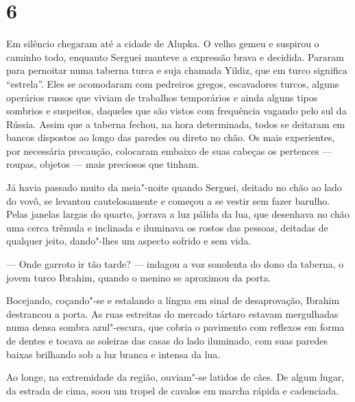 \section{6}

Em silêncio chegaram até a cidade de Alupka. O velho gemeu e suspirou o
caminho todo, enquanto Serguei manteve a expressão brava e decidida.
Pararam para pernoitar numa taberna turca e suja chamada Yildiz, que em
turco significa ``estrela''. Eles se acomodaram com pedreiros gregos,
escavadores turcos, alguns operários russos que viviam de trabalhos
temporários e ainda alguns tipos sombrios e suspeitos, daqueles que são
vistos com frequência vagando pelo sul da Rússia. Assim que a taberna
fechou, na hora determinada, todos se deitaram em bancos dispostos ao
longo das paredes ou direto no chão. Os mais experientes, por necessária
precaução, colocaram embaixo de suas cabeças os pertences --- roupas,
objetos --- mais preciosos que tinham.

Já havia passado muito da meia"-noite quando Serguei, deitado no chão ao
lado do vovô, se levantou cautelosamente e começou a se vestir sem fazer
barulho. Pelas janelas largas do quarto, jorrava a luz pálida da lua,
que desenhava no chão uma cerca trêmula e inclinada e iluminava os
rostos das pessoas, deitadas de qualquer jeito, dando"-lhes um aspecto
sofrido e sem vida.

--- Onde garroto ir tão tarde? --- indagou a voz sonolenta do dono da
taberna, o jovem turco Ibrahim, quando o menino se aproximou da porta.


Bocejando, coçando"-se e estalando a língua em sinal de desaprovação,
Ibrahim destrancou a porta. As ruas estreitas do mercado tártaro estavam
mergulhadas numa densa sombra azul"-escura, que cobria o pavimento com
reflexos em forma de dentes e tocava as soleiras das casas do lado
iluminado, com suas paredes baixas brilhando sob a luz branca e intensa
da lua.

Ao longe, na extremidade da região, ouviam"-se latidos de cães. De algum
lugar, da estrada de cima, soou um tropel de cavalos em marcha rápida e
cadenciada.

